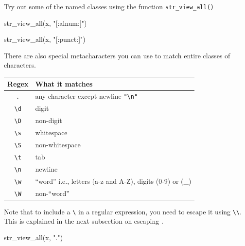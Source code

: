 \documentclass[
]{book}
\newenvironment{Shaded}{\begin{snugshade}}{\end{snugshade}}
\newcommand{\FunctionTok}[1]{\textcolor[rgb]{0.00,0.00,0.00}{#1}}
\newcommand{\NormalTok}[1]{#1}
\newcommand{\StringTok}[1]{\textcolor[rgb]{0.31,0.60,0.02}{#1}}
\begin{document}
Try out some of the named classes using the function \texttt{str\_view\_all()}

\begin{Shaded}
\begin{Highlighting}[]
\FunctionTok{str\_view\_all}\NormalTok{(x, }\StringTok{"[:alnum:]"}\NormalTok{)}
\end{Highlighting}
\end{Shaded}

\begin{Shaded}
\begin{Highlighting}[]
\FunctionTok{str\_view\_all}\NormalTok{(x, }\StringTok{"[:punct:]"}\NormalTok{)}
\end{Highlighting}
\end{Shaded}

There are also special metacharacters you can use to match entire classes of characters.

\begin{longtable}[]{@{}cl@{}}
\toprule
Regex & What it matches \\
\midrule
\endhead
\texttt{.} & any character except newline \texttt{"\textbackslash{}n"} \\
\texttt{\textbackslash{}d} & digit \\
\texttt{\textbackslash{}D} & non-digit \\
\texttt{\textbackslash{}s} & whitespace \\
\texttt{\textbackslash{}S} & non-whitespace \\
\texttt{\textbackslash{}t} & tab \\
\texttt{\textbackslash{}n} & newline \\
\texttt{\textbackslash{}w} & ``word'' i.e., letters (a-z and A-Z), digits (0-9) or (\_) \\
\texttt{\textbackslash{}W} & non-``word'' \\
\bottomrule
\end{longtable}

Note that to include a \texttt{\textbackslash{}} in a regular expression, you need to escape it using \texttt{\textbackslash{}\textbackslash{}}. This is explained in the next subsection on escaping .

\begin{Shaded}
\begin{Highlighting}[]
\FunctionTok{str\_view\_all}\NormalTok{(x, }\StringTok{"."}\NormalTok{)}
\end{Highlighting}
\end{Shaded}
\end{document}
